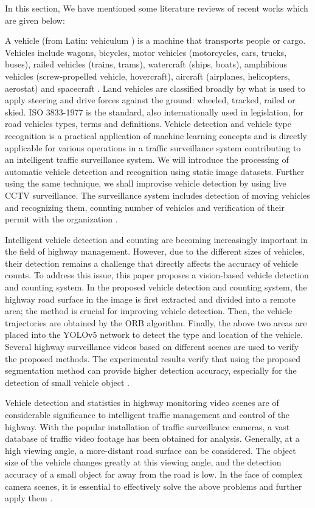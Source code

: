 
In this section, We have mentioned some literature reviews of recent works which are given below:

A vehicle (from Latin: vehiculum \cite{vehicleDef}) is a machine that transports people or cargo. Vehicles include wagons, bicycles, motor vehicles (motorcycles, cars, trucks, buses), railed vehicles (trains, trams), watercraft (ships, boats), amphibious vehicles (screw-propelled vehicle, hovercraft), aircraft (airplanes, helicopters, aerostat) and spacecraft \cite{wikipediaVehicle}. Land vehicles are classified broadly by what is used to apply steering and drive forces against the ground: wheeled, tracked, railed or skied. ISO 3833-1977 is the standard, also internationally used in legislation, for road vehicles types, terms and definitions. Vehicle detection and vehicle type recognition is a practical application of machine learning concepts and is directly applicable for various operations in a traffic surveillance system contributing to an intelligent traffic surveillance system. We will introduce the processing of automatic vehicle detection and recognition using static image datasets. Further using the same technique, we shall improvise vehicle detection by using live CCTV surveillance. The surveillance system includes detection of moving vehicles and recognizing them, counting number of vehicles and verification of their permit with the organization \cite{SriashikaAddala2020}.


Intelligent vehicle detection and counting are becoming increasingly important in the field of highway management. However, due to the different sizes of vehicles, their detection remains a challenge that directly affects the accuracy of vehicle counts. To address this issue, this paper proposes a vision-based vehicle detection and counting system. In the proposed vehicle detection and counting system, the highway road surface in the image is first extracted and divided into a remote area; the method is crucial for improving vehicle detection. Then, the vehicle trajectories are obtained by the ORB algorithm. Finally, the above two areas are placed into the YOLOv5 network to detect the type and location of the vehicle. Several highway surveillance videos based on different scenes are used to verify the proposed methods. The experimental results verify that using the proposed segmentation method can provide higher detection accuracy, especially for the detection of small vehicle object \cite{SriashikaAddala2020}. 

Vehicle detection and statistics in highway monitoring video scenes are of considerable significance to intelligent traffic management and control of the highway. With the popular installation of traffic surveillance cameras, a vast database of traffic video footage has been obtained for analysis. Generally, at a high viewing angle, a more-distant road surface can be considered. The object size of the vehicle changes greatly at this viewing angle, and the detection accuracy of a small object far away from the road is low. In the face of complex camera scenes, it is essential to effectively solve the above problems and further apply them \cite{SongH2019}. 



